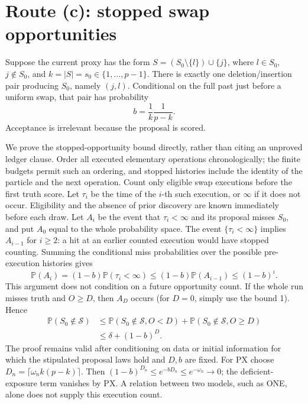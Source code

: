 ﻿\documentclass[11pt]{article}
\newcommand{\Pp}{\mathbb P}
\newcommand{\1}{\mathbf 1}
\newcommand{\Sc}{\mathcal S}
\begin{document}
\section{Route (c): stopped swap opportunities}
Suppose the current proxy has the form
\(S=(S_0\setminus\{l\})\cup\{j\}\), where
\(l\in S_0\), \(j\notin S_0\), and \(k=|S|=s_0\in\{1,\ldots,p-1\}\).
There is exactly one deletion/insertion pair producing \(S_0\), namely
\((j,l)\). Conditional on the full past just before a uniform swap,
that pair has probability
\begin{equation}\label{eq:swap}
 b=\frac1k\frac1{p-k}.
\end{equation}
Acceptance is irrelevant because the proposal is scored.

We prove the stopped-opportunity bound directly, rather than citing an
unproved ledger clause. Order all executed elementary operations
chronologically; the finite budgets permit such an ordering, and stopped
histories include the identity of the particle and the next operation.
Count only eligible swap executions before the first truth score. Let
\(\tau_i\) be the time of the \(i\)-th such execution, or \(\infty\)
if it does not occur. Eligibility and the absence of prior discovery are
known immediately before each draw. Let \(A_i\) be the event that
\(\tau_i<\infty\) and its proposal misses \(S_0\), and put
\(A_0\) equal to the whole probability space. The event
\(\{\tau_i<\infty\}\) implies \(A_{i-1}\) for \(i\ge2\): a hit at
an earlier counted execution would have stopped counting. Summing the
conditional miss probabilities over the possible pre-execution histories
gives
\[
 \Pp(A_i)=(1-b)\Pp(\tau_i<\infty)
 \le(1-b)\Pp(A_{i-1})\le(1-b)^i.
\]
This argument does not condition on a future opportunity count. If the
whole run misses truth and \(O\ge D\), then \(A_D\) occurs (for
\(D=0\), simply use the bound 1). Hence
\begin{align*}
 \Pp(S_0\notin\Sc)
 &\le\Pp(S_0\notin\Sc,O<D)
     +\Pp(S_0\notin\Sc,O\ge D)\\
 &\le\delta+(1-b)^D.
\end{align*}
The proof remains valid after conditioning on data or initial information
for which the stipulated proposal laws hold and \(D,b\) are fixed.
For PX choose \(D_n=\lceil\omega_n k(p-k)\rceil\). Then
\((1-b)^{D_n}\le e^{-bD_n}\le e^{-\omega_n}\to0\); the deficient-exposure
term vanishes by PX. A relation between two models, such as ONE, alone
does not supply this execution count.
\end{document}
